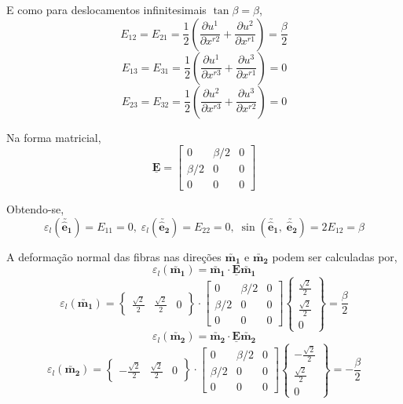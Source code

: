 \begin{enumerate}
    E como para deslocamentos infinitesimais $\tan\beta=\beta$,
    \[E_{12}=E_{21}=\frac{1}{2}\left(\frac{\partial u^1}{\partial x^{r2}}+\frac{\partial u^2}{\partial x^{r1}}\right)=\frac{\beta}{2}\]
    \[E_{13}=E_{31}=\frac{1}{2}\left(\frac{\partial u^1}{\partial x^{r3}}+\frac{\partial u^3}{\partial x^{r1}}\right)=0\]
    \[E_{23}=E_{32}=\frac{1}{2}\left(\frac{\partial u^2}{\partial x^{r3}}+\frac{\partial u^3}{\partial x^{r2}}\right)=0\]
    
    Na forma matricial,
    \[
        \underline{\mathbf{E}}
        =
        \begin{bmatrix}
            0 & \beta/2 & 0 \\
            \beta/2 & 0 & 0 \\
            0 & 0 & 0
        \end{bmatrix}	
    \]
    
    Obtendo-se,
    \[
        \varepsilon_l(\utilde{\mathbf{\hat{e}_1}})=E_{11}=0,\;
        \varepsilon_l(\utilde{\mathbf{\hat{e}_2}})=E_{22}=0,\;
        \sin(\utilde{\mathbf{\hat{e}_1}},\;\utilde{\mathbf{\hat{e}_2}})=2E_{12}=\beta
    \]
    
    A deformação normal das fibras nas direções $\utilde{\mathbf{m_1}}$ e $\utilde{\mathbf{m_2}}$ podem ser calculadas por,
    \[\varepsilon_l(\utilde{\mathbf{m_1}})=\utilde{\mathbf{m_1}}\cdot\underline{\mathbf{E}}\utilde{\mathbf{m_1}}\]
    \[
        \varepsilon_l(\utilde{\mathbf{m_1}})
        =
        \begin{Bmatrix}
            \frac{\sqrt{2}}{2} & \frac{\sqrt{2}}{2} & 0
        \end{Bmatrix}
        \cdot
        \begin{bmatrix}
            0 & \beta/2 & 0 \\
            \beta/2 & 0 & 0 \\
            0 & 0 & 0
        \end{bmatrix}
        \begin{Bmatrix}
            \frac{\sqrt{2}}{2} \\ \frac{\sqrt{2}}{2} \\ 0
        \end{Bmatrix}
        =\frac{\beta}{2}
    \]
    \[\varepsilon_l(\utilde{\mathbf{m_2}})=\utilde{\mathbf{m_2}}\cdot\underline{\mathbf{E}}\utilde{\mathbf{m_2}}\]
    \[
        \varepsilon_l(\utilde{\mathbf{m_2}})
        =
        \begin{Bmatrix}
            -\frac{\sqrt{2}}{2} & \frac{\sqrt{2}}{2} & 0
        \end{Bmatrix}
        \cdot
        \begin{bmatrix}
            0 & \beta/2 & 0 \\
            \beta/2 & 0 & 0 \\
            0 & 0 & 0
        \end{bmatrix}
        \begin{Bmatrix}
            -\frac{\sqrt{2}}{2} \\ \frac{\sqrt{2}}{2} \\ 0
        \end{Bmatrix}
        =-\frac{\beta}{2}
    \]
    

\end{enumerate}
